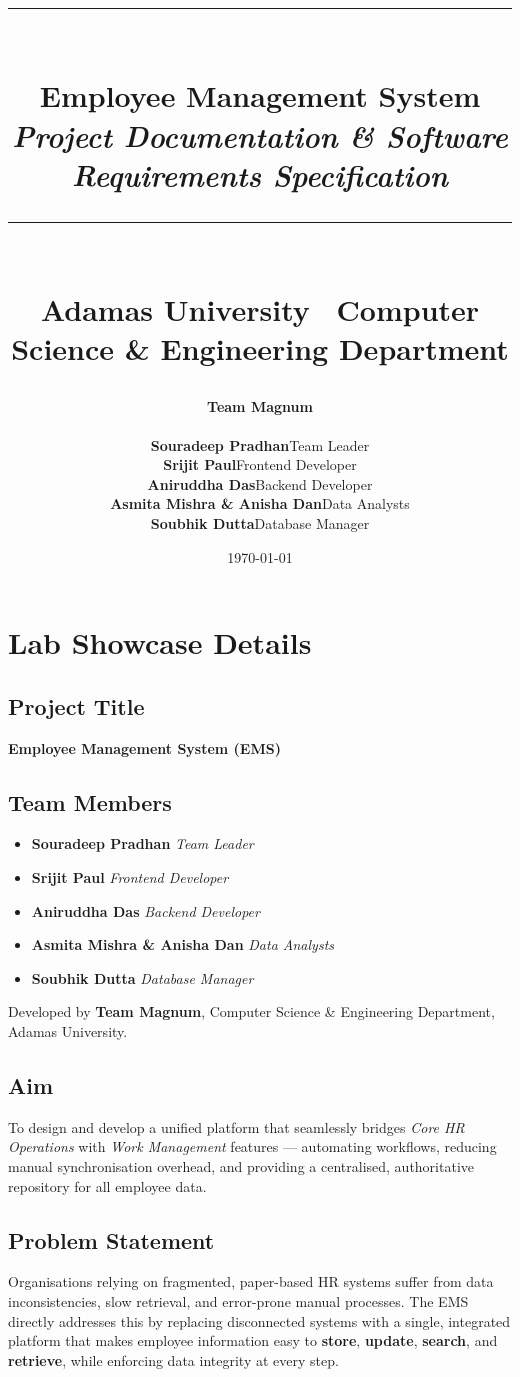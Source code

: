 \documentclass[12pt,a4paper]{report}
\title{%
  \vspace{2cm}
  {\rule{\linewidth}{1.5pt}}\\[0.6cm]
  {\bfseries\Huge Employee Management System}\\[0.3cm]
  {\large\itshape Project Documentation \& Software Requirements Specification}\\[0.6cm]
  {\rule{\linewidth}{1.5pt}}\\[0.4cm]
  {\normalsize Adamas University \textbar\ Computer Science \& Engineering Department}
}
\author{%
  \vspace{0.5cm}
  {\large\bfseries Team Magnum}\\[0.4cm]
  \begin{tabular}{ll}
    \textbf{Souradeep Pradhan}           & Team Leader \\
    \textbf{Srijit Paul}                 & Frontend Developer \\
    \textbf{Aniruddha Das}               & Backend Developer \\
    \textbf{Asmita Mishra \& Anisha Dan} & Data Analysts \\
    \textbf{Soubhik Dutta}               & Database Manager \\
  \end{tabular}
}
\date{\today}
\begin{document}
\maketitle
\thispagestyle{empty}
\newpage
\tableofcontents
\newpage

\chapter{Lab Showcase Details}

\section{Project Title}
\textbf{Employee Management System (EMS)}

\section{Team Members}
\begin{itemize}
  \item \textbf{Souradeep Pradhan} \hfill \textit{Team Leader}
  \item \textbf{Srijit Paul} \hfill \textit{Frontend Developer}
  \item \textbf{Aniruddha Das} \hfill \textit{Backend Developer}
  \item \textbf{Asmita Mishra \& Anisha Dan} \hfill \textit{Data Analysts}
  \item \textbf{Soubhik Dutta} \hfill \textit{Database Manager}
\end{itemize}
Developed by \textbf{Team Magnum}, Computer Science \& Engineering Department, Adamas University.

\section{Aim}
To design and develop a unified platform that seamlessly bridges \textit{Core HR Operations} with \textit{Work Management} features --- automating workflows, reducing manual synchronisation overhead, and providing a centralised, authoritative repository for all employee data.

\section{Problem Statement}
Organisations relying on fragmented, paper-based HR systems suffer from data inconsistencies, slow retrieval, and error-prone manual processes. The EMS directly addresses this by replacing disconnected systems with a single, integrated platform that makes employee information easy to \textbf{store}, \textbf{update}, \textbf{search}, and \textbf{retrieve}, while enforcing data integrity at every step.
\end{document}
